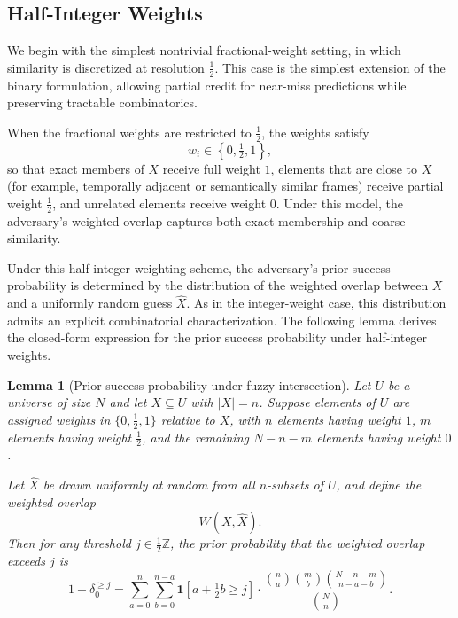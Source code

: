 \documentclass[sigconf,anonymous, review]{acmart}
\newtheorem{lemma}[theorem]{Lemma}
\begin{document}
\subsection{Half-Integer Weights}

We begin with the simplest nontrivial fractional-weight setting, in which similarity is discretized at resolution $\tfrac12$. This case is the simplest extension of the binary formulation, allowing partial credit for near-miss predictions while preserving tractable combinatorics.

When the fractional weights are restricted to $\tfrac12$, the weights satisfy
\[
w_i \in \left\{0, \tfrac12, 1 \right\},
\]
so that exact members of $X$ receive full weight $1$, elements that are close to $X$ (for example, temporally adjacent or semantically similar frames) receive partial weight $\tfrac12$, and unrelated elements receive weight $0$. Under this model, the adversary's weighted overlap captures both exact membership and coarse similarity.

Under this half-integer weighting scheme, the adversary's prior success probability is determined by the distribution of the weighted overlap between $X$ and a uniformly random guess $\widehat{X}$. As in the integer-weight case, this distribution admits an explicit combinatorial characterization. The following lemma derives the closed-form expression for the prior success probability under half-integer weights.

\begin{lemma}[Prior success probability under fuzzy intersection]
Let $U$ be a universe of size $N$ and let $X \subseteq U$ with $|X| = n$.
Suppose elements of $U$ are assigned weights in $\{0,\tfrac12,1\}$ relative to $X$,
with $n$ elements having weight $1$, $m$ elements having weight $\tfrac12$,
and the remaining $N-n-m$ elements having weight $0$.

Let $\widehat{X}$ be drawn uniformly at random from all $n$-subsets of $U$, and define the weighted overlap
\[
W(X,\widehat{X}).
\]
Then for any threshold $j \in \tfrac12\mathbb{Z}$, the prior probability that the weighted overlap exceeds $j$ is
\begin{equation}
\label{eq:fuzzy_prior_probability}
1 - \delta_0^{\ge j}
=
\sum_{a=0}^{n}
\sum_{b=0}^{n-a}
\mathbf{1}\!\left[a + \tfrac12 b \ge j \right]
\cdot
\frac{
\binom{n}{a}
\binom{m}{b}
\binom{N-n-m}{\,n-a-b\,}
}{
\binom{N}{n}
}.
\end{equation}
\end{lemma}
\end{document}
